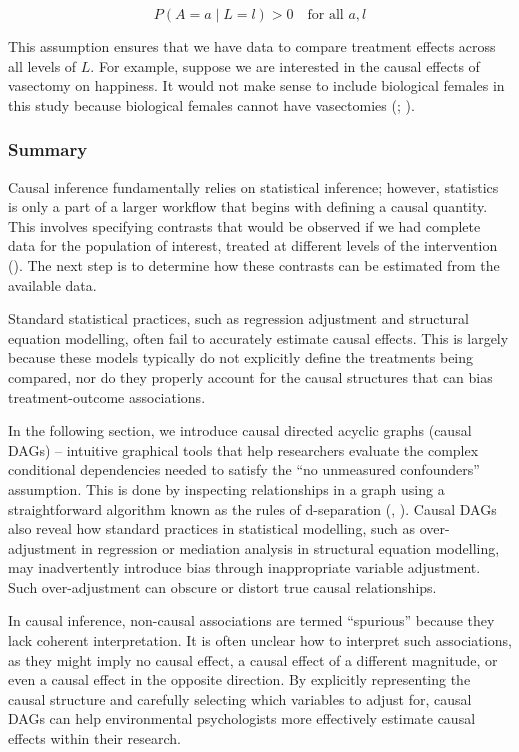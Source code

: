 \documentclass[
  singlecolumn]{article}
\begin{document}
\[
P(A = a \mid L = l) > 0 \quad \text{for all } a, l
\]

This assumption ensures that we have data to compare treatment effects
across all levels of \(L\). For example, suppose we are interested in
the causal effects of vasectomy on happiness. It would not make sense to
include biological females in this study because biological females
cannot have vasectomies (; ).

\subsubsection{Summary}\label{summary}

Causal inference fundamentally relies on statistical inference; however,
statistics is only a part of a larger workflow that begins with defining
a causal quantity. This involves specifying contrasts that would be
observed if we had complete data for the population of interest, treated
at different levels of the intervention
(). The next step is
to determine how these contrasts can be estimated from the available
data.

Standard statistical practices, such as regression adjustment and
structural equation modelling, often fail to accurately estimate causal
effects. This is largely because these models typically do not
explicitly define the treatments being compared, nor do they properly
account for the causal structures that can bias treatment-outcome
associations.

In the following section, we introduce causal directed acyclic graphs
(causal DAGs) -- intuitive graphical tools that help researchers
evaluate the complex conditional dependencies needed to satisfy the ``no
unmeasured confounders'' assumption. This is done by inspecting
relationships in a graph using a straightforward algorithm known as the
rules of d-separation (,
). Causal DAGs also reveal how standard
practices in statistical modelling, such as over-adjustment in
regression or mediation analysis in structural equation modelling, may
inadvertently introduce bias through inappropriate variable adjustment.
Such over-adjustment can obscure or distort true causal relationships.

In causal inference, non-causal associations are termed ``spurious''
because they lack coherent interpretation. It is often unclear how to
interpret such associations, as they might imply no causal effect, a
causal effect of a different magnitude, or even a causal effect in the
opposite direction. By explicitly representing the causal structure and
carefully selecting which variables to adjust for, causal DAGs can help
environmental psychologists more effectively estimate causal effects
within their research.
\end{document}
